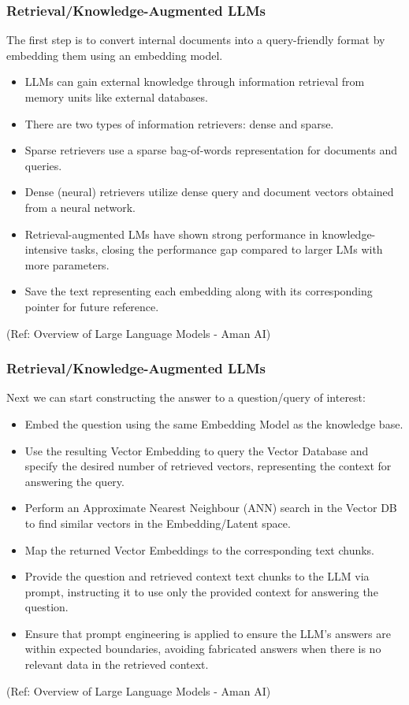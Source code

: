 \begin{frame}[fragile]\frametitle{Retrieval/Knowledge-Augmented LLMs}

The first step is to convert internal documents into a query-friendly format by embedding them using an embedding model.

\begin{itemize}
\item LLMs can gain external knowledge through information retrieval from memory units like external databases.
\item There are two types of information retrievers: dense and sparse.
\item Sparse retrievers use a sparse bag-of-words representation for documents and queries.
\item Dense (neural) retrievers utilize dense query and document vectors obtained from a neural network.
\item Retrieval-augmented LMs have shown strong performance in knowledge-intensive tasks, closing the performance gap compared to larger LMs with more parameters.
\item Save the text representing each embedding along with its corresponding pointer for future reference.
\end{itemize}

{\tiny (Ref: Overview of Large Language Models - Aman AI)}

\end{frame}

\begin{frame}[fragile]\frametitle{Retrieval/Knowledge-Augmented LLMs}

Next we can start constructing the answer to a question/query of interest:

\begin{itemize}
\item Embed the question using the same Embedding Model as the knowledge base.
\item Use the resulting Vector Embedding to query the Vector Database and specify the desired number of retrieved vectors, representing the context for answering the query.
\item Perform an Approximate Nearest Neighbour (ANN) search in the Vector DB to find similar vectors in the Embedding/Latent space.
\item Map the returned Vector Embeddings to the corresponding text chunks.
\item Provide the question and retrieved context text chunks to the LLM via prompt, instructing it to use only the provided context for answering the question.
\item Ensure that prompt engineering is applied to ensure the LLM's answers are within expected boundaries, avoiding fabricated answers when there is no relevant data in the retrieved context.
\end{itemize}

{\tiny (Ref: Overview of Large Language Models - Aman AI)}

\end{frame}

